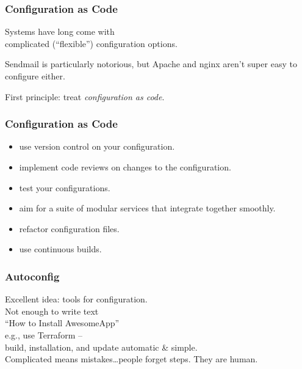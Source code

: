 \begin{frame}
\frametitle{Configuration as Code}

\large

Systems have long come with \\
complicated (``flexible'') configuration options.


Sendmail is particularly notorious, but Apache and nginx aren't super
easy to configure either.

First principle: treat \emph{configuration as code}.


\end{frame}



\begin{frame}
\frametitle{Configuration as Code}

\large

\begin{itemize}
\item use version control on your configuration.
\item implement code reviews on changes to the configuration.
\item test your configurations.
\item aim for a suite of modular services that integrate together smoothly.
\item refactor configuration files.
\item use continuous builds.
\end{itemize}


\end{frame}



\begin{frame}
\frametitle{Autoconfig}

\large

Excellent idea: tools for configuration. \\[1em]

Not enough to write text \\
\qquad ``How to Install AwesomeApp'' \\[1em]

e.g., use Terraform -- \\
build, installation, and update automatic \& simple.\\[1em]

 Complicated means mistakes\ldots people forget steps. They are human. 
 
 
\end{frame}


